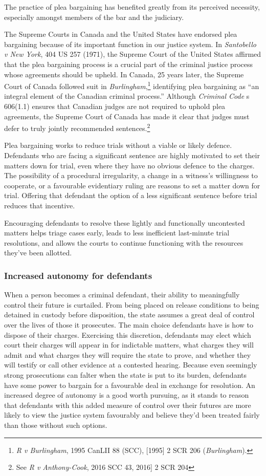 The practice of plea bargaining has benefited greatly from its perceived necessity, especially amongst members of the bar and the judiciary.

The Supreme Courts in Canada and the United States have endorsed plea bargaining because of its important function in our justice system. In \textit{Santobello v New York}, 404 US 257 (1971), the Supreme Court of the United States affirmed that the plea bargaining process is a crucial part of the criminal justice process whose agreements should be upheld. In Canada, 25 years later, the Supreme Court of Canada followed suit in \textit{Burlingham},\footnote{\textit{R v Burlingham}, 1995 CanLII 88 (SCC), [1995] 2 SCR 206 (\textit{Burlingham}).} identifying plea bargaining as ``an integral element of the Canadian criminal process.'' Although \textit{Criminal Code} s 606(1.1) ensures that Canadian judges are not required to uphold plea agreements, the Supreme Court of Canada has made it clear that judges must defer to truly jointly recommended sentences.\footnote{See \textit{R v Anthony-Cook}, 2016 SCC 43, 2016] 2 SCR 204}

Plea bargaining works to reduce trials without a viable or likely defence. Defendants who are facing a significant sentence are highly motivated to set their matters down for trial, even where they have no obvious defence to the charges. The possibility of a procedural irregularity, a change in a witness's willingness to cooperate, or a favourable evidentiary ruling are reasons to set a matter down for trial. Offering that defendant the option of a less significant sentence before trial reduces that incentive.

Encouraging defendants to resolve these lightly and functionally uncontested matters helps triage cases early, leads to less inefficient last-minute trial resolutions, and allows the courts to continue functioning with the resources they've been allotted. 

\subsubsection{Increased autonomy for defendants}

When a person becomes a criminal defendant, their ability to meaningfully control their future is curtailed. From being placed on release conditions to being detained in custody before disposition, the state assumes a great deal of control over the lives of those it prosecutes. The main choice defendants have is how to dispose of their charges. Exercising this discretion, defendants may elect which court their charges will appear in for indictable matters, what charges they will admit and what charges they will require the state to prove, and whether they will testify or call other evidence at a contested hearing. Because even seemingly strong prosecutions can falter when the state is put to its burden, defendants have some power to bargain for a favourable deal in exchange for resolution. An increased degree of autonomy is a good worth pursuing, as it stands to reason that defendants with this added measure of control over their futures are more likely to view the justice system favourably and believe they'd been treated fairly than those without such options.

